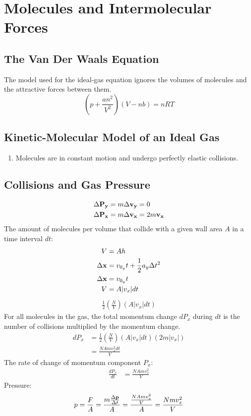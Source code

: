 \documentclass{article}
\begin{document}
\section{Molecules and Intermolecular Forces}

\subsection{The Van Der Waals Equation}

The model used for the ideal-gas equation ignores the volumes of molecules and the
attractive forces between them.
\begin{equation}
	\left( p + \frac{ an^2 }{ V^2 } \right) (V - nb) = nRT
\end{equation}

\subsection{Kinetic-Molecular Model of an Ideal Gas}

\begin{enumerate}
	\item Molecules are in constant motion and undergo perfectly elastic collisions.
\end{enumerate}

\subsection{Collisions and Gas Pressure}

\begin{align*}
	\Delta \vect{P_y} & = m\Delta \vect{v_y} = 0 \\
	\Delta \vect{P_x} & = m\Delta \vect{v_x} = 2m\vect{v_x}
\end{align*}
The amount of molecules per volume that collide with a given wall area $ A $ in a time interval $ dt $:
\begin{align*}
	V & = Ah \\
	\Delta \vect{x} & = v_{0_y}t + \frac{1}{2}a_y\Delta t^2 \\
	\Delta \vect{x} & = v_{0_y}t \\
	V & = A|v_{x}|dt
\end{align*}
\begin{align*}
	\frac{1}{2} \left( \frac{ N }{ V } \right) (A|v_{x}|dt)
\end{align*}
For all molecules in the gas, the total momentum change $ dP_{x} $ during $ dt $ is the number of collisions multiplied by the momentum change.
\begin{align*}
	dP_{x} & = \frac{1}{2} \left( \frac{ N }{ V } \right) (A|v_{x}|dt) (2m|v_{x}|) \\
		   & = \frac{ NAmv_{x}^2dt }{ V }
\end{align*}
The rate of change of momentum component $ P_{x} $:
\begin{align*}
	\frac{ dP_{x} }{ dt } & = \frac{ NAmv_{x}^2 }{ V }
\end{align*}
Pressure:
\begin{equation}
	p = \frac{ F }{ A } = \frac{ m\frac{ \Delta \vect{p} }{ \Delta t } }{ A } = \frac{ \frac{ NAmv_{x}^2 }{ V } }{ A }  = \frac{ Nmv_{x}^2 }{ V }
\end{equation}
\end{document}
